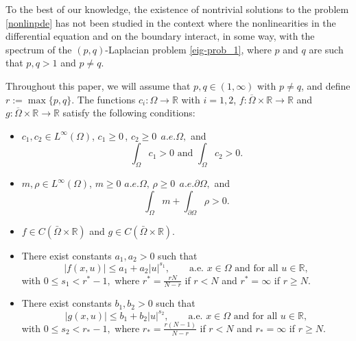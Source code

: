 \documentclass[pdflatex,sn-mathphys-num]{sn-jnl}
\theoremstyle{thmstyleone}%
\theoremstyle{thmstyletwo}%
\theoremstyle{thmstylethree}%
\theoremstyle{thmstylethree}%
\begin{document}
To the best of our knowledge, the existence of nontrivial solutions to the problem \eqref{nonlinpde} has not been studied in the context where the nonlinearities in the differential equation and on the boundary interact, in some way, with the spectrum of the $(p,q)$-Laplacian problem \eqref{eig-prob_1}, where $p$ and $q$ are such that  $p,q>1$ and $p\neq q$. 

Throughout this paper, we will assume that $p,q\in (1,\infty)$ with $p\neq q$, and define $r:=\max\{p,q\}$. The functions  $c_i: \Omega \to \mathbb{R}$ with $i=1,2$,  $f:\overline{\Omega}\times \mathbb{R}\to \mathbb{R}$ and  $g:\overline{\Omega}\times \mathbb{R}\to \mathbb{R}$ satisfy the following conditions:
\begin{itemize}
    \item[(C1)] $c_1,c_2\in L^{\infty}(\Omega)$, $  c_1 \ge 0\, $, $ c_2\ge 0\, \;a.e.  \Omega,$ and\begin{equation*}\label{c:conditions}
   \int_\Omega c_1 >0 \mbox{ and } \int_\Omega c_2 >0.
\end{equation*} 
 \item[(C2)] $m, \rho\in L^{\infty}(\Omega)$, $  m \ge 0\,\, a.e. \Omega ,\,  \rho\ge 0\, \;a.e. \partial \Omega,$ and 
\begin{equation*}\label{mrho}
  \int_\Omega m+ \int_{\partial\Omega} \rho>0  .   
\end{equation*}

    \item[(C3)] $f\in C(\bar{\Omega}\times \mathbb{R})$ and $g\in C(\bar{\Omega}\times \mathbb{R})$.
    \item[(C4)] There exist constants $a_1, a_2>0$ such that 
\begin{equation*}
    |f(x,u)|\le a_1+a_2|u|^{s_1}, \qquad \mbox{a.e.  $x\in \Omega$ and for all $u\in \mathbb{R}$},
\end{equation*}
     with    $0\le s_1<r^*-1,$
where $r^*=\frac{rN}{N-r}$ if $r<N$ and  $r^*=\infty $ if $ r\ge N$.
     \item[(C5)] There exist constants $b_1, b_2>0$ such that 
     \begin{equation*}
      |g(x,u)|\le b_1+b_2|u|^{s_2}   , \qquad \mbox{a.e.  $x\in \Omega$ and for all $u\in \mathbb{R}$},
     \end{equation*}
    with  $0\le s_2<r_*-1, $
    where   $r_*=\frac{r(N-1)}{N-r}$ if $r<N$ and $r_*=\infty$ if $r\ge N$.
    \end{itemize}
\end{document}
